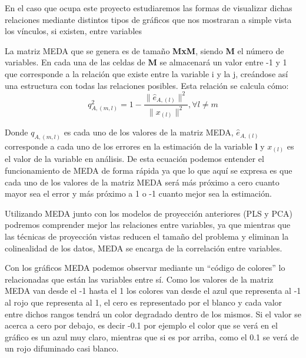 En el caso que ocupa este proyecto estudiaremos las formas de visualizar dichas relaciones mediante distintos tipos de gráficos que nos mostraran a simple vista los vínculos, si existen, entre variables
\bigskip

La matriz MEDA que se genera es de tamaño \textbf{MxM}, siendo \textbf{M} el número de variables. En cada una de las celdas de \textbf{M} se almacenará un valor entre -1 y 1 que corresponde a la relación que existe entre la variable i y la j, creándose así una estructura con todas las relaciones posibles. Esta relación se calcula cómo: 
\begin{equation}
q^2_{A,(m,l)}=1-\frac{\parallel \widehat{e}_{A,(l)}\parallel ^2}{\parallel x_{(l)} \parallel ^2} ,\forall l \neq m
\end{equation}


Donde \textbf{$q_{A,(m,l)}$} es cada uno de los valores de la matriz MEDA, \textbf{$\widehat{e}_{A,(l)}$} corresponde a cada uno de los errores en la estimación de la variable \textbf{l} y \textbf{$x_{(l)}$}  es el valor de la variable en análisis. De esta ecuación podemos entender el funcionamiento de MEDA de forma rápida ya que lo que aquí se expresa es que cada uno de los valores de la matriz MEDA será más próximo a cero cuanto mayor sea el error y más próximo a 1 o -1 cuanto mejor sea la estimación.
\bigskip

Utilizando MEDA junto con los modelos de proyección anteriores (PLS y PCA) podremos comprender mejor las relaciones entre variables, ya que mientras que las técnicas de proyección vistas reducen el tamaño del problema y eliminan la colinealidad de los datos, MEDA se encarga de la correlación entre variables.
\bigskip

Con los gráficos MEDA podemos observar mediante un “código de colores” lo relacionadas que están las variables entre sí. Como los valores de la matriz MEDA van desde el -1 hasta el 1 los colores van desde el azul que representa al -1 al rojo que representa al 1, el cero es representado por el blanco y cada valor entre dichos rangos tendrá un color degradado dentro de los mismos. Si el valor se acerca a cero por debajo, es decir -0.1 por ejemplo el color que se verá en el gráfico es un azul muy claro, mientras que si es por arriba, como el 0.1 se verá de un rojo difuminado casi blanco.
\bigskip

